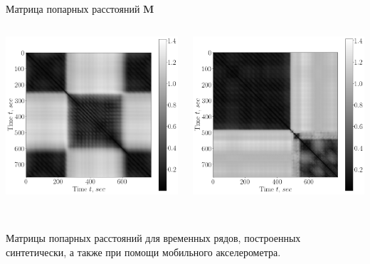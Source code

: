 \documentclass[10pt,pdf,hyperref={unicode}]{beamer}
\begin{document}
\begin{frame}[shrink=5]{Матрица попарных расстояний $\textbf{M}$}
\begin{columns}
    \begin{column}{0.35\textwidth}
        \includegraphics[width=1\textwidth]{results/real_1_full}
    \end{column}
    \begin{column}{0.35\textwidth}
        \includegraphics[width=1\textwidth]{results/real_2_full}
    \end{column}
\end{columns}

~\\
Матрицы попарных расстояний для временных рядов, построенных синтетически, а также при помощи мобильного акселерометра.

\end{frame}
\end{document}
